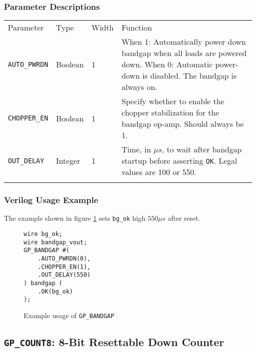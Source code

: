 \documentclass[11pt]{article}
\newcommand{\tokenstyle}[1]{\texttt{#1}}
\newcommand{\wirestyle}[1]{\texttt{#1}}
\newcommand{\whenstyle}[1]{{\fontseries{sb}\selectfont#1}}
\newcommand{\thinhline}{\Xhline{1\arrayrulewidth}}
\newcommand{\thickhline}{\Xhline{2.5\arrayrulewidth}}
\begin{document}
\subsubsection{Parameter Descriptions}

\begin{tabularx}{\textwidth}{lllX}
\thinhline
\whenstyle{Parameter} & \whenstyle{Type} & \whenstyle{Width} & \whenstyle{Function} \\
\thickhline
\tokenstyle{AUTO\_PWRDN} & Boolean & 1 &
	\whenstyle{When 1:} Automatically power down bandgap when all loads are powered down. \newline
	\whenstyle{When 0:} Automatic power-down is disabled. \newline The bandgap is always on.\\
\thinhline
\tokenstyle{CHOPPER\_EN} & Boolean & 1 &
	Specify whether to enable the chopper stabilization for the bandgap op-amp. Should always be 1. \\
\thinhline
\tokenstyle{OUT\_DELAY} & Integer & 1 &
	Time, in $\mu s$, to wait after bandgap startup before asserting \tokenstyle{OK}. Legal values are 100 or 550.\\
\thinhline
\end{tabularx}

\subsubsection{Verilog Usage Example}

The example shown in figure \ref{gp-bandgap-example} sets \wirestyle{bg\_ok} high $550 \mu s$ after reset.

\begin{figure}[h]
\begin{lstlisting}
wire bg_ok;
wire bandgap_vout;
GP_BANDGAP #(
	.AUTO_PWRDN(0),
	.CHOPPER_EN(1),
	.OUT_DELAY(550)
) bandgap (
	.OK(bg_ok)
);
\end{lstlisting}
\caption{Example usage of \tokenstyle{GP\_BANDGAP}}
\label{gp-bandgap-example}
\end{figure}


\pagebreak
\subsection{\tokenstyle{GP\_COUNT8}: 8-Bit Resettable Down Counter}
\label{gp-count8}
\end{document}
